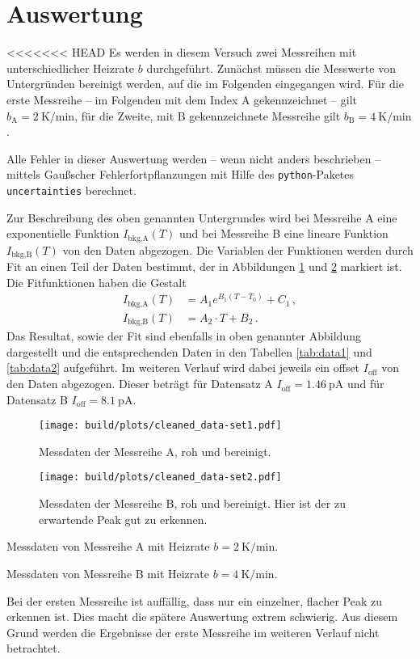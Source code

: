\section{Auswertung}
<<<<<<< HEAD
\label{sec:auswertung}
Es werden in diesem Versuch zwei Messreihen mit unterschiedlicher Heizrate
$b$ durchgeführt. Zunächst müssen die Messwerte von Untergründen bereinigt
werden, auf die im Folgenden eingegangen wird.
Für die erste Messreihe -- im Folgenden mit dem Index A gekennzeichnet --
gilt $b_\text{A} = \SI{2}{\kelvin\per\minute}$, für die Zweite, mit B
gekennzeichnete Messreihe gilt $b_\text{B} = \SI{4}{\kelvin\per\minute}$.

Alle Fehler in dieser Auswertung werden -- wenn nicht anders beschrieben --
mittels Gaußscher Fehlerfortpflanzungen mit Hilfe des \texttt{python}-Paketes
\texttt{uncertainties} \cite{py-uncertainties} berechnet.

Zur Beschreibung des oben genannten Untergrundes wird bei Messreihe A eine
exponentielle Funktion $I_\text{bkg,A}(T)$ und bei Messreihe B eine lineare
Funktion
$I_\text{bkg,B}(T)$ von den Daten abgezogen. Die Variablen der Funktionen werden
durch Fit an einen Teil der Daten bestimmt, der in Abbildungen
\ref{fig:data-a} und \ref{fig:data-b} markiert ist.
Die Fitfunktionen haben die Gestalt
\begin{align*}
    I_\text{bkg,A}(T) &= A_1 e^{B_1 (T-T_0)} + C_1\,,\\
    I_\text{bkg,B}(T) &= A_2\cdot T + B_2\,.
\end{align*}
Das Resultat, sowie der Fit sind ebenfalls in oben genannter Abbildung
dargestellt und die entsprechenden Daten in den Tabellen \ref{tab:data1} und
\ref{tab:data2} aufgeführt.
Im weiteren Verlauf wird dabei jeweils ein offset $I_\text{off}$ von den Daten
abgezogen. Dieser beträgt für Datensatz A $I_\text{off} = \SI{1.46}{\pico\ampere}$
und für Datensatz B $I_\text{off} = \SI{8.1}{\pico\ampere}$.
\begin{figure}
    \centering
    \texttt{[image: build/plots/cleaned\_data-set1.pdf]}
    \caption{Messdaten der Messreihe A, roh und bereinigt.}
    \label{fig:data-a}
\end{figure}
\begin{figure}
    \centering
    \texttt{[image: build/plots/cleaned\_data-set2.pdf]}
    \caption{Messdaten der Messreihe B, roh und bereinigt. Hier ist
    der zu erwartende Peak gut zu erkennen.}
    \label{fig:data-b}
\end{figure}
\begin{table}
    \centering
    \caption{Messdaten von Messreihe A mit Heizrate $b = \SI{2}{\kelvin\per\minute}$.}
    \label{tab:data1}
    
\end{table}
\begin{table}
    \centering
    \caption{Messdaten von Messreihe B mit Heizrate $b = \SI{4}{\kelvin\per\minute}$.}
    \label{tab:data2}
    
\end{table}
Bei der ersten Messreihe ist auffällig, dass nur ein einzelner, flacher Peak
zu erkennen ist. Dies macht die spätere Auswertung extrem schwierig.
Aus diesem Grund werden die Ergebnisse der erste Messreihe im weiteren
Verlauf nicht betrachtet.

